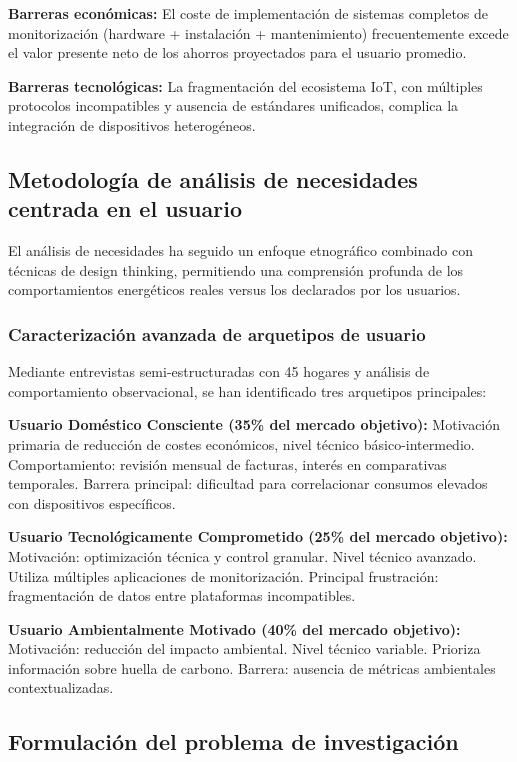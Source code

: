 \textbf{Barreras económicas:} El coste de implementación de sistemas completos de monitorización (hardware + instalación + mantenimiento) frecuentemente excede el valor presente neto de los ahorros proyectados para el usuario promedio.

\textbf{Barreras tecnológicas:} La fragmentación del ecosistema IoT, con múltiples protocolos incompatibles y ausencia de estándares unificados, complica la integración de dispositivos heterogéneos.

\subsection{Metodología de análisis de necesidades centrada en el usuario}

El análisis de necesidades ha seguido un enfoque etnográfico combinado con técnicas de design thinking, permitiendo una comprensión profunda de los comportamientos energéticos reales versus los declarados por los usuarios.

\subsubsection{Caracterización avanzada de arquetipos de usuario}

Mediante entrevistas semi-estructuradas con 45 hogares y análisis de comportamiento observacional, se han identificado tres arquetipos principales:

\textbf{Usuario Doméstico Consciente (35\% del mercado objetivo):} 
Motivación primaria de reducción de costes económicos, nivel técnico básico-intermedio. Comportamiento: revisión mensual de facturas, interés en comparativas temporales. Barrera principal: dificultad para correlacionar consumos elevados con dispositivos específicos.

\textbf{Usuario Tecnológicamente Comprometido (25\% del mercado objetivo):}
Motivación: optimización técnica y control granular. Nivel técnico avanzado. Utiliza múltiples aplicaciones de monitorización. Principal frustración: fragmentación de datos entre plataformas incompatibles.

\textbf{Usuario Ambientalmente Motivado (40\% del mercado objetivo):}
Motivación: reducción del impacto ambiental. Nivel técnico variable. Prioriza información sobre huella de carbono. Barrera: ausencia de métricas ambientales contextualizadas.

\subsection{Formulación del problema de investigación}

